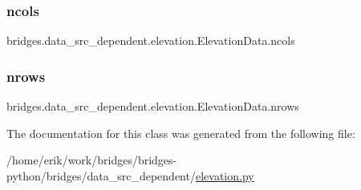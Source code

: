 \subsubsection{\texorpdfstring{ncols}{ncols}}
{\footnotesize\ttfamily bridges.\+data\+\_\+src\+\_\+dependent.\+elevation.\+Elevation\+Data.\+ncols}

\mbox{\label{classbridges_1_1data__src__dependent_1_1elevation_1_1_elevation_data_adc326f6bc8eb64eaaa6d5a83c7094d60}} 
\subsubsection{\texorpdfstring{nrows}{nrows}}
{\footnotesize\ttfamily bridges.\+data\+\_\+src\+\_\+dependent.\+elevation.\+Elevation\+Data.\+nrows}



The documentation for this class was generated from the following file\+:\begin{DoxyCompactItemize}
\item 
/home/erik/work/bridges/bridges-\/python/bridges/data\+\_\+src\+\_\+dependent/\hyperlink{elevation_8py}{elevation.\+py}\end{DoxyCompactItemize}

